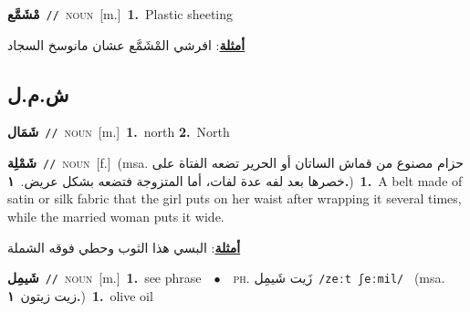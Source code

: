 \documentclass[10pt,a4paper,twoside]{article} %
\begin{document}
\begin{multicols}{2}
{\setlength\topsep{0pt}\textbf{\foreignlanguage{arabic}{مْشَمَّع}}\ {\color{gray}\texttt{//}\color{black}}\ \textsc{noun}\ [m.]\ \textbf{1.}~Plastic sheeting\  \begin{flushright}\color{gray}\foreignlanguage{arabic}{\textbf{\underline{\foreignlanguage{arabic}{أمثلة}}}: افرشي المْشَمَّع عشان مانوسخ السجاد}\end{flushright}\color{black}} \vspace{2mm}

\vspace{-3mm}
\subsection*{\color{blue}\foreignlanguage{arabic}{ش.م.ل}\color{blue}{}} 

{\setlength\topsep{0pt}\textbf{\foreignlanguage{arabic}{شَمَال}}\ {\color{gray}\texttt{//}\color{black}}\ \textsc{noun}\ [m.]\ \textbf{1.}~north  \textbf{2.}~North\ } \vspace{2mm}

{\setlength\topsep{0pt}\textbf{\foreignlanguage{arabic}{شَمْلِة}}\ {\color{gray}\texttt{//}\color{black}}\ \textsc{noun}\ [f.]\ \color{gray}(msa. \foreignlanguage{arabic}{حزام مصنوع من قماش الساتان أو الحرير تضعه الفتاة على خصرها بعد لفه عدة لفات، أما المتزوجة فتضعه بشكل عريض.}~\foreignlanguage{arabic}{\textbf{١.}})\color{black}\ \textbf{1.}~A belt made of satin or silk fabric that the girl puts on her waist after wrapping it several times, while the married woman puts it wide.\  \begin{flushright}\color{gray}\foreignlanguage{arabic}{\textbf{\underline{\foreignlanguage{arabic}{أمثلة}}}: البسي هذا الثوب وحطي فوقه الشملة}\end{flushright}\color{black}} \vspace{2mm}

{\setlength\topsep{0pt}\textbf{\foreignlanguage{arabic}{شَيمِل}}\ {\color{gray}\texttt{//}\color{black}}\ \textsc{noun}\ [m.]\ \textbf{1.}~see phrase\ \ $\bullet$\ \ \textsc{ph.} \color{gray} \foreignlanguage{arabic}{زَيت شَيمِل}\color{black}\ {\color{gray}\texttt{/{\sffamily zeːt ʃeːmil}/}\color{black}}\ \color{gray} (msa. \foreignlanguage{arabic}{زيت زيتون}~\foreignlanguage{arabic}{\textbf{١.}})\color{black}\ \textbf{1.}~olive oil\ } \vspace{2mm}


\end{multicols}
\end{document}
